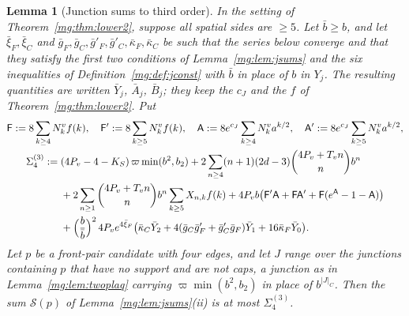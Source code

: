 \documentclass[11pt,a4paper]{article}
\newtheorem{lemma}[theorem]{Lemma}
\theoremstyle{definition}
\theoremstyle{remark}
\begin{document}
\begin{lemma}[Junction sums to third order]\label{mg:lem:jsums3}
In the setting of Theorem~\ref{mg:thm:lower2}, suppose all spatial sides are $\ge5$. Let $\bar b\ge b$, and let $\bar\xi_F,\bar\xi_C$ and
$\bar g_F,\bar g_C,\bar g'_F,\bar g'_C,\bar\kappa_F,\bar\kappa_C$ be such that the series below converge and that they satisfy the first two conditions of Lemma~\ref{mg:lem:jsums} and the six inequalities of
Definition~\ref{mg:def:jconst} with $\bar b$ in place of $b$ in $Y_j$. The resulting quantities are written $\bar Y_j$, $\bar A_j$, $\bar B_j$; they keep the
$c_J$ and the $f$ of Theorem~\ref{mg:thm:lower2}. Put
\begin{gather*}
\mathsf F:=8\sum_{k\ge4}N^v_kf(k),\quad\mathsf F':=8\sum_{k\ge5}N^v_kf(k),\quad\mathsf A:=8e^{c_J}\sum_{k\ge4}N^v_ka^{k/2},\quad\mathsf A':=8e^{c_J}\sum_{k\ge5}N^v_ka^{k/2},\\
\begin{aligned}
\Sigma^{(3)}_4:=\;&(4P_v-4-K_S)\,\varpi\min(b^2,b_2)+2\sum_{n\ge4}(n+1)(2d-3)\binom{4P_v+T_vn}{n}b^n\\
&+2\sum_{n\ge1}\binom{4P_v+T_vn}{n}b^n\sum_{k\ge5}X_{n,k}f(k)+4P_vb\bigl(\mathsf F'\mathsf A+\mathsf F\mathsf A'+\mathsf F(e^{\mathsf A}-1-\mathsf A)\bigr)\\
&+\Bigl(\frac b{\bar b}\Bigr)^2\,4P_ve^{4\bar\xi_F}\bigl(\bar\kappa_C\bar Y_2+4(\bar g_C\bar g'_F+\bar g'_C\bar g_F)\bar Y_1+16\bar\kappa_F\bar Y_0\bigr).
\end{aligned}
\end{gather*}
Let $p$ be a front-pair candidate with four edges, and let $J$ range over the junctions containing $p$ that have no support and are not caps, a junction as
in Lemma~\ref{mg:lem:twoplaq} carrying $\varpi\min(b^2,b_2)$ in place of $b^{|J|_C}$. Then the sum $\mathcal S(p)$ of Lemma~\ref{mg:lem:jsums}(ii) is at most
$\Sigma^{(3)}_4$.
\end{lemma}
\end{document}
